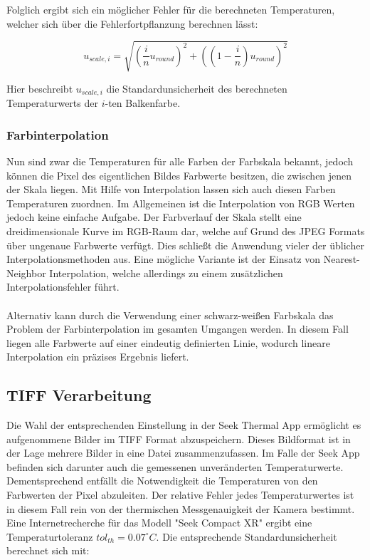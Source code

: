 \documentclass[10pt,a4paper,german]{article}
\begin{document}
Folglich ergibt sich ein möglicher Fehler für die berechneten Temperaturen, welcher sich über die Fehlerfortpflanzung berechnen lässt:

\begin{equation}
    u_{scale,i} = \sqrt{\left(\frac{i}{n} u_{round} \right)^2 + \left(\left(1 - \frac{i}{n}\right) u_{round}\right)^2}
\end{equation}

Hier beschreibt $u_{scale,i}$ die Standardunsicherheit des berechneten Temperaturwerts der $i$-ten Balkenfarbe.

\subsubsection{Farbinterpolation}
Nun sind zwar die Temperaturen für alle Farben der Farbskala bekannt, jedoch können die Pixel des eigentlichen Bildes Farbwerte besitzen, die zwischen jenen der Skala liegen.
Mit Hilfe von Interpolation lassen sich auch diesen Farben Temperaturen zuordnen.
Im Allgemeinen ist die Interpolation von RGB Werten jedoch keine einfache Aufgabe. 
Der Farbverlauf der Skala stellt eine dreidimensionale Kurve im RGB-Raum dar, welche auf Grund des JPEG Formats über ungenaue Farbwerte verfügt.
Dies schließt die Anwendung vieler der üblicher Interpolationsmethoden aus.
Eine mögliche Variante ist der Einsatz von Nearest-Neighbor Interpolation, welche allerdings zu einem zusätzlichen Interpolationsfehler führt.
\\
\\
Alternativ kann durch die Verwendung einer schwarz-weißen Farbskala das Problem der Farbinterpolation im gesamten Umgangen werden.
In diesem Fall liegen alle Farbwerte auf einer eindeutig definierten Linie, wodurch lineare Interpolation ein präzises Ergebnis liefert.


\subsection{TIFF Verarbeitung}
Die Wahl der entsprechenden Einstellung in der Seek Thermal App ermöglicht es aufgenommene Bilder im TIFF Format abzuspeichern. 
Dieses Bildformat ist in der Lage mehrere Bilder in eine Datei zusammenzufassen.
Im Falle der Seek App befinden sich darunter auch die gemessenen unveränderten Temperaturwerte.
Dementsprechend entfällt die Notwendigkeit die Temperaturen von den Farbwerten der Pixel abzuleiten.
Der relative Fehler jedes Temperaturwertes ist in diesem Fall rein von der thermischen Messgenauigkeit der Kamera bestimmt.
Eine Internetrecherche für das Modell "Seek Compact XR" ergibt eine Temperaturtoleranz $tol_{th} = 0.07 ^{\circ}C$.
Die entsprechende Standardunsicherheit berechnet sich mit:
\end{document}
